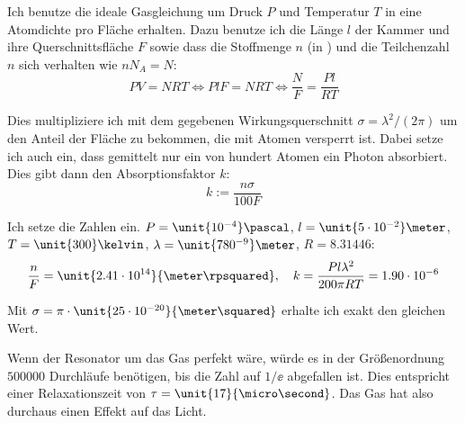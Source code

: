Ich benutze die ideale Gasgleichung um Druck $P$ und Temperatur $T$ in eine
Atomdichte pro Fläche erhalten. Dazu benutze ich die Länge $l$ der Kammer und
ihre Querschnittsfläche $F$ sowie dass die Stoffmenge $n$ (in \mole) und die
Teilchenzahl $n$ sich verhalten wie $n N_A = N$:
\[
	PV = NRT
	\iff
	PlF = NRT
	\iff
	\frac NF = \frac{Pl}{RT}
\]

Dies multipliziere ich mit dem gegebenen Wirkungsquerschnitt $\sigma =
\lambda^2/(2 \pi)$ um den Anteil der Fläche zu bekommen, die mit Atomen
versperrt ist. Dabei setze ich auch ein, dass gemittelt nur ein von
hundert Atomen ein Photon absorbiert. Dies gibt dann den
Absorptionsfaktor $k$:
\[
	k := \frac{n \sigma}{100 F}
\]

Ich setze die Zahlen ein. $P = \unit{10^{-4}}\pascal$, $l =
\unit{5 \e{-2}}\meter$, $T = \unit{300}\kelvin$, $\lambda =
\unit{780^{-9}}\meter$, $R = 8.31446$:
\[
	\frac nF = \unit{2.41\e{14}}{\meter\rpsquared}
	\eqnsep
	k = \frac{P l \lambda^2}{200 \pi R T} = 1.90 \e{-6}
\]

Mit $\sigma = \pi \cdot \unit{25\e{-20}}{\meter\squared}$ erhalte ich exakt den gleichen Wert.

Wenn der Resonator um das Gas perfekt wäre, würde es in der Größenordnung
$500000$ Durchläufe benötigen, bis die Zahl auf $1/\ee$ abgefallen ist. Dies
entspricht einer Relaxationszeit von $\tau = \unit{17}{\micro\second}$. Das Gas
hat also durchaus einen Effekt auf das Licht.

%
%



